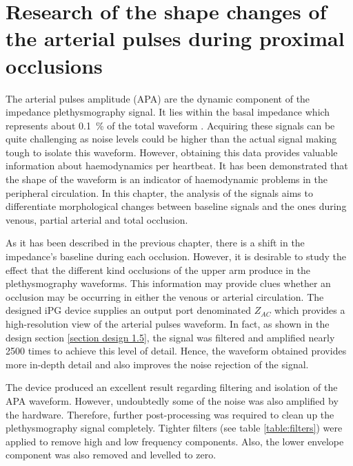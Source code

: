
\chapter{Research of the shape changes of the arterial pulses during proximal occlusions}  %
\label{chapter apa}

\ifpdf
\graphicspath{{Chapter8/Figs/Raster/}{Chapter8/Figs/PDF/}{Chapter8/Figs/}}
\else
\graphicspath{{Chapter8/Figs/Vector/}{Chapter8/Figs/}}
\fi

The arterial pulses amplitude (APA) are the dynamic component of the impedance plethysmography signal. It lies within the basal impedance which represents about \SI{0.1}{\percent} of the total waveform \cite{anderson1984impedance}. Acquiring these signals can be quite challenging as noise levels could be higher than the actual signal making tough to isolate this waveform. However, obtaining this data provides valuable information about haemodynamics per heartbeat. It has been demonstrated that the shape of the waveform is an indicator of haemodynamic problems in the peripheral circulation. In this chapter, the analysis of the signals aims to differentiate morphological changes between baseline signals and the ones during venous, partial arterial and total occlusion.

As it has been described in the previous chapter, there is a shift in the impedance's baseline during each occlusion. However, it is desirable to study the effect that the different kind occlusions of the upper arm produce in the plethysmography waveforms.  This information may provide clues whether an occlusion may be occurring in either the venous or arterial circulation.  The designed iPG device supplies an output port denominated $Z_{AC}$  which provides a high-resolution view of the arterial pulses waveform.  In fact, as shown in the design section \ref{section design 1.5}, the signal was filtered and amplified nearly 2500 times to achieve this level of detail. Hence, the waveform obtained provides more in-depth detail and also improves the noise rejection of the signal.

The device produced an excellent result regarding filtering and isolation of the APA waveform. However, undoubtedly some of the noise was also amplified by the hardware. Therefore, further post-processing was required to clean up the plethysmography signal completely. Tighter filters (see table \ref{table:filters}) were applied to remove high and low frequency components. Also, the lower envelope component was also removed and levelled to zero. 

